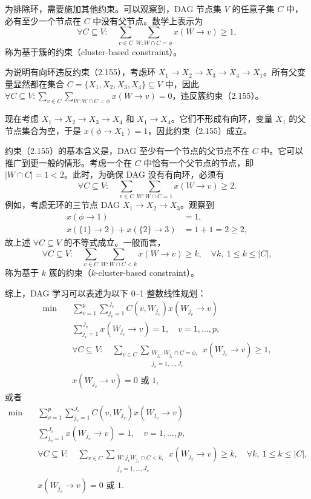 为排除环，需要施加其他约束。可以观察到，DAG 节点集 $V$ 的任意子集 $C$ 中，必有至少一个节点在 $C$ 中没有父节点。数学上表示为
\begin{equation}
\forall C\subseteq V:\quad
\sum_{v\in C}\sum_{W:W\cap C=\phi}x(W\to v)\geq1,
\tag{2.155}
\end{equation}
称为基于簇的约束（cluster-based constraint）。

为说明有向环违反约束（2.155），考虑环 $X_1\to X_2\to X_3\to X_4\to X_1$。所有父变量显然都在集合 $C=\{X_1,X_2,X_3,X_4\}\subseteq V$ 中，因此
$\forall C\subseteq V:\sum_{v\in C}\sum_{W:W\cap C=\phi}x(W\to v)=0$，违反簇约束（2.155）。

现在考虑 $X_1\to X_2\to X_3\to X_4$ 和 $X_1\to X_4$。它们不形成有向环，变量 $X_1$ 的父节点集合为空，于是 $x(\phi\to X_1)=1$，因此约束（2.155）成立。

约束（2.155）的基本含义是，DAG 至少有一个节点的父节点不在 $C$ 中。它可以推广到更一般的情形。考虑一个在 $C$ 中恰有一个父节点的节点，即 $|W\cap C|=1<2$。此时，为确保 DAG 没有有向环，必须有
\[
\forall C\subseteq V:\quad
\sum_{v\in C}\sum_{W:W\cap C=1}x(W\to v)\geq2.
\]
例如，考虑无环的三节点 DAG $X_1\to X_2\to X_3$。观察到
\[
\begin{aligned}
x(\phi\to1)&=1,\\
x(\{1\}\to2)+x(\{2\}\to3)&=1+1=2\geq2,
\end{aligned}
\]
故上述 $\forall C\subseteq V$ 的不等式成立。一般而言，
\begin{equation}
\forall C\subseteq V:\quad
\sum_{v\in C}\sum_{W:W\cap C<k}x(W\to v)\geq k,
\quad\forall k,\ 1\leq k\leq|C|,
\tag{2.156}
\end{equation}
称为基于 $k$ 簇的约束（$k$-cluster-based constraint）。

综上，DAG 学习可以表述为以下 0--1 整数线性规划：
\begin{equation}
\begin{aligned}
\min\quad&\sum_{v=1}^{p}\sum_{j_v=1}^{J_v}C(v,W_{j_v})x(W_{j_v}\to v)\\
&\sum_{j_v=1}^{J_v}x(W_{j_v}\to v)=1,\quad v=1,\ldots,p,\\
&\forall C\subseteq V:\quad
\sum_{v\in C}\sum_{\substack{W_{j_v}:W_{j_v}\cap C=\phi,\\j_v=1,\ldots,J_v}}
x(W_{j_v}\to v)\geq1,\\
&x(W_{j_v}\to v)=0\text{ 或 }1,
\end{aligned}\tag{2.157}
\end{equation}
或者
\begin{equation}
\begin{aligned}
\min\quad&\sum_{v=1}^{p}\sum_{j_v=1}^{J_v}C(v,W_{j_v})x(W_{j_v}\to v)\\
&\sum_{j_v=1}^{J_v}x(W_{j_v}\to v)=1,\quad v=1,\ldots,p,\\
&\forall C\subseteq V:\quad
\sum_{v\in C}\sum_{\substack{W:j_vW_{j_v}\cap C<k,\\j_v=1,\ldots,J_v}}
x(W_{j_v}\to v)\geq k,\quad\forall k,\ 1\leq k\leq|C|,\\
&x(W_{j_v}\to v)=0\text{ 或 }1.
\end{aligned}\tag{2.158}
\end{equation}

